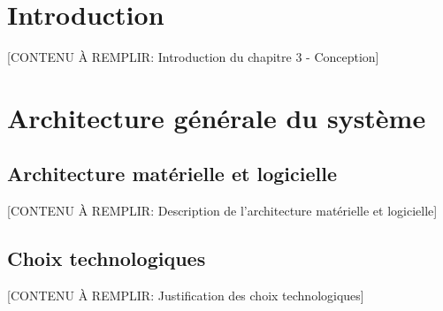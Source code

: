 \section*{Introduction}


[CONTENU À REMPLIR: Introduction du chapitre 3 - Conception]

\section{Architecture générale du système}


\subsection{Architecture matérielle et logicielle}

[CONTENU À REMPLIR: Description de l'architecture matérielle et logicielle]


\subsection{Choix technologiques}


[CONTENU À REMPLIR: Justification des choix technologiques]


